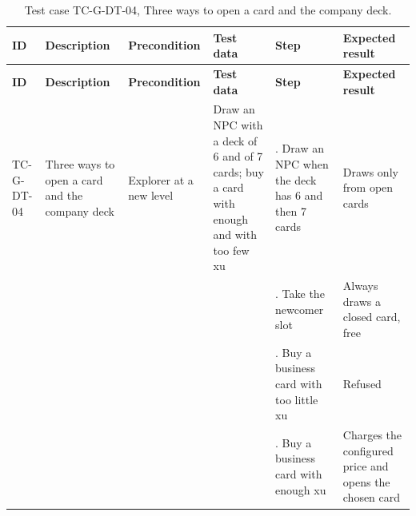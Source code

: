 {\footnotesize{}\renewcommand{\arraystretch}{1.1}
\begin{longtable}{|>{\raggedright\arraybackslash}p{}|>{\raggedright\arraybackslash}p{}|>{\raggedright\arraybackslash}p{}|>{\raggedright\arraybackslash}p{}|>{\raggedright\arraybackslash}p{}|>{\raggedright\arraybackslash}p{}|}
\caption{Test case TC-G-DT-04, Three ways to open a card and the company deck.} \\
\hline
\textbf{ID} & \textbf{Description} & \textbf{Precondition} & \textbf{Test data} & \textbf{Step} & \textbf{Expected result} \\ \hline
\endfirsthead
\hline
\textbf{ID} & \textbf{Description} & \textbf{Precondition} & \textbf{Test data} & \textbf{Step} & \textbf{Expected result} \\ \hline
\endhead
TC-G-DT-04 & Three ways to open a card and the company deck & Explorer at a new level & Draw an NPC with a deck of 6 and of 7 cards; buy a card with enough and with too few xu & 1. Draw an NPC when the deck has 6 and then 7 cards & Draws only from open cards \\ \cline{5-6}
 &  &  &  & 2. Take the newcomer slot & Always draws a closed card, free \\ \cline{5-6}
 &  &  &  & 3. Buy a business card with too little xu & Refused \\ \cline{5-6}
 &  &  &  & 4. Buy a business card with enough xu & Charges the configured price and opens the chosen card \\ \hline
\end{longtable}
}


